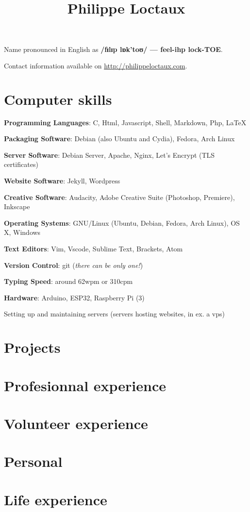 \documentclass[a4paper]{article}
\title{Philippe Loctaux}
\begin{document}
\maketitle

Name pronounced in English as \textbf{/fɪlɪp lɒk’toʊ/ — feel-ihp lock-TOE}.%

Contact information available on \url{http://philippeloctaux.com}.

\section*{Computer skills}

\begin{description}
	\item \textbf{Programming Languages}: C, Html, Javascript, Shell, Markdown, Php, \LaTeX
	\item \textbf{Packaging Software}: Debian (also Ubuntu and Cydia), Fedora, Arch Linux
	\item \textbf{Server Software}: Debian Server, Apache, Nginx, Let's Encrypt (TLS certificates)
	\item \textbf{Website Software}: Jekyll, Wordpress
	\item \textbf{Creative Software}: Audacity, Adobe Creative Suite (Photoshop, Premiere), Inkscape
	\item \textbf{Operating Systems}: GNU/Linux (Ubuntu, Debian, Fedora, Arch Linux), OS X, Windows
	\item \textbf{Text Editors}: Vim, Vscode, Sublime Text, Brackets, Atom
	\item \textbf{Version Control}: git (\textit{there can be only one!})
	\item \textbf{Typing Speed}: around 62wpm or 310cpm
	\item \textbf{Hardware}: Arduino, ESP32, Raspberry Pi (3)
	\item Setting up and maintaining servers (servers hosting websites, in ex. a vps)
\end{description}

\section*{Projects}
\section*{Profesionnal experience}
\section*{Volunteer experience}
\section*{Personal}
\section*{Life experience}
\end{document}
